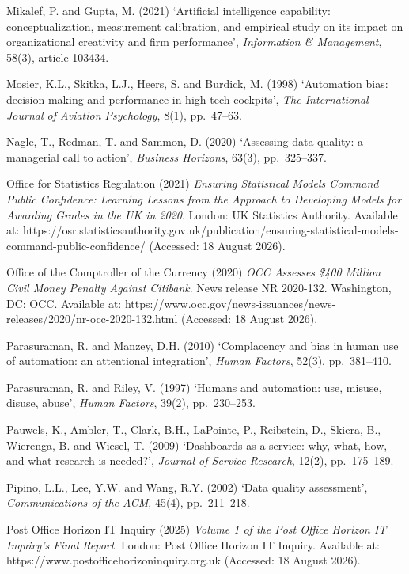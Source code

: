 \documentclass[11pt,a4paper]{article}
\numberwithin{figure}{section}
\numberwithin{table}{section}
\newcommand{\ct}[1]{\textcolor{citeblue}{#1}}          %
\begin{document}
{Mikalef, P. and Gupta, M. (2021) `Artificial intelligence capability: conceptualization, measurement
calibration, and empirical study on its impact on organizational creativity and firm performance',
\emph{Information \& Management}, 58(3), article 103434.

Mosier, K.L., Skitka, L.J., Heers, S. and Burdick, M. (1998) `Automation bias: decision making and
performance in high-tech cockpits', \emph{The International Journal of Aviation Psychology}, 8(1),
pp.~47--63.

Nagle, T., Redman, T. and Sammon, D. (2020) `Assessing data quality: a managerial call to action',
\emph{Business Horizons}, 63(3), pp.~325--337.

Office for Statistics Regulation (2021) \emph{Ensuring Statistical Models Command Public Confidence:
Learning Lessons from the Approach to Developing Models for Awarding Grades in the UK in 2020}.
London: UK Statistics Authority. Available at:
\ct{https://osr.statisticsauthority.gov.uk/publication/ensuring-statistical-models-command-public-confidence/}
(Accessed: 18 August 2026).

Office of the Comptroller of the Currency (2020) \emph{OCC Assesses \$400 Million Civil Money
Penalty Against Citibank}. News release NR 2020-132. Washington, DC: OCC. Available at:
\ct{https://www.occ.gov/news-issuances/news-releases/2020/nr-occ-2020-132.html} (Accessed: 18 August
2026).

Parasuraman, R. and Manzey, D.H. (2010) `Complacency and bias in human use of automation: an
attentional integration', \emph{Human Factors}, 52(3), pp.~381--410.

Parasuraman, R. and Riley, V. (1997) `Humans and automation: use, misuse, disuse, abuse',
\emph{Human Factors}, 39(2), pp.~230--253.

Pauwels, K., Ambler, T., Clark, B.H., LaPointe, P., Reibstein, D., Skiera, B., Wierenga, B. and
Wiesel, T. (2009) `Dashboards as a service: why, what, how, and what research is needed?',
\emph{Journal of Service Research}, 12(2), pp.~175--189.

Pipino, L.L., Lee, Y.W. and Wang, R.Y. (2002) `Data quality assessment', \emph{Communications of the
ACM}, 45(4), pp.~211--218.

Post Office Horizon IT Inquiry (2025) \emph{Volume 1 of the Post Office Horizon IT Inquiry's Final
Report}. London: Post Office Horizon IT Inquiry. Available at:
\ct{https://www.postofficehorizoninquiry.org.uk} (Accessed: 18 August 2026).

}
\end{document}
